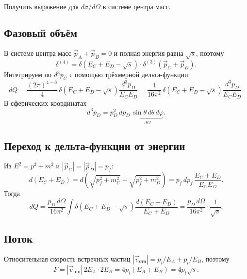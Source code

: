 \documentclass[../final.tex]{subfiles}
\begin{document}
\condition
Получить выражение для $d\sigma/d\Omega$ в системе центра масс.

\solution
\subsection*{Фазовый объём}

В системе центра масс $\vec p_A+\vec p_B=0$ и полная энергия равна $\sqrt s$,
поэтому
\begin{equation*}
    \delta^{(4)}=\delta\!\left(E_C+E_D-\sqrt s\right)\cdot
    \delta^{(3)}\!\left(\vec p_C+\vec p_D\right).
\end{equation*}
Интегрируем по $d^3p_C$ с помощью трёхмерной дельта-функции:
\begin{equation*}
    dQ=\frac{(2\pi)^{4-6}}{4}\,
    \delta\!\left(E_C+E_D-\sqrt s\right)
    \frac{d^3p_D}{E_CE_D}
    =\frac{1}{16\pi^2}\,
    \delta\!\left(E_C+E_D-\sqrt s\right)
    \frac{d^3p_D}{E_CE_D}.
\end{equation*}
В сферических координатах
\begin{equation*}
    d^3p_D=p_D^2\,dp_D\,\underbrace{\sin\theta\,d\theta\,d\varphi}_{d\Omega}.
\end{equation*}

\subsection*{Переход к дельта-функции от энергии}

Из $E^2=p^2+m^2$ и $|\vec p_C|=|\vec p_D|=p_f$:
\begin{equation*}
    d(E_C+E_D)
    =d\!\left(\sqrt{p_f^2+m_C^2}+\sqrt{p_f^2+m_D^2}\right)
    =p_f\,dp_f\,\frac{E_C+E_D}{E_CE_D}.
\end{equation*}
Тогда
\begin{equation*}
    dQ=\frac{p_D\,d\Omega}{16\pi^2}
    \int\delta\!\left(E_C+E_D-\sqrt s\right)
    \frac{d(E_C+E_D)}{E_C+E_D}
    =\frac{p_D\,d\Omega}{16\pi^2}\cdot\frac{1}{\sqrt s}.
\end{equation*}

\subsection*{Поток}

Относительная скорость встречных частиц
$|\vec v_{\text{отн}}|=p_i/E_A+p_i/E_B$, поэтому
\begin{equation*}
    F=|\vec v_{\text{отн}}|\,2E_A\cdot2E_B
    =4p_i(E_A+E_B)
    =4p_i\sqrt s.
\end{equation*}
\end{document}
